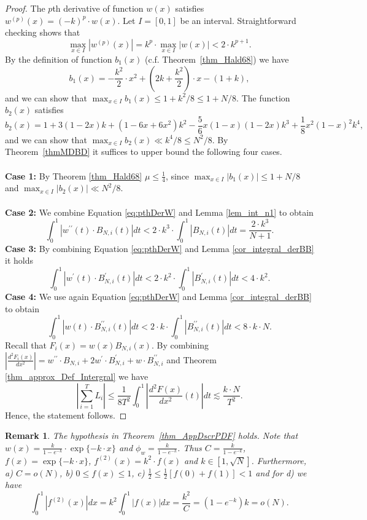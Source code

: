 \documentclass[11pt]{article}
\newcommand{\phiw}{\phi_{w}}
\newcommand{\prm}{\prime}
\renewcommand{\leq}{\leqslant}
\newtheorem{rem}[thm]{Remark}
\numberwithin{thm}{section}
\begin{document}
\begin{proof}
The $p$th derivative of function $w(x)$ satisfies $w^{(p)}(x)=(-k)^{p}\cdot w(x)$. Let $I=[0,1]$ be an interval. Straightforward checking shows that
\begin{equation}\label{eq:pthDerW}
\max_{x\in I}|w^{(p)}(x)| = k^p \cdot \max_{x\in I}|w(x)| < 2\cdot k^{p+1}.
\end{equation}
By the definition of function $b_1(x)$ (c.f. Theorem~\ref{thm_Hald68}) we have
\[
b_{1}(x)=-\frac{k^2}{2}\cdot x^{2} + \left(2k + \frac{k^2}{2} \right)\cdot x -(1+k),
\]
and we can show that $\max_{x\in I}b_{1}(x)\leq 1+k^2/8 \leq 1+N/8$. The function $b_2(x)$ satisfies
\[
b_{2}(x)=1+3(1-2x)k+(1-6x+6x^{2})k^2-\frac{5}{6}x(1-x)(1-2x)k^3 + \frac{1}{8}x^{2}(1-x)^{2}k^{4},
\]
and we can show that $\max_{x\in I}b_{2}(x)\ll k^{4}/8\leq N^2/8$. By Theorem~\ref{thmMDBD} it suffices to upper bound the following four cases.\\
\\
\textbf{Case 1:} By Theorem \ref{thm_Hald68} $\mu\leq\frac{1}{4}$, since $\max_{x\in I}|b_{1}(x)|\leq 1+N/8$
and $\max_{x\in I}|b_{2}(x)|\ll N^{2}/8$.\\
\\
\textbf{Case 2:} We combine Equation \ref{eq:pthDerW}
and Lemma \ref{lem_int_n1} to obtain
\[
\int_{0}^{1}|w^{\prm\prm}(t)\cdot B_{N,i}(t)|dt < 2\cdot k^{3}\cdot\int_{0}^{1}|B_{N,i}(t)|dt=\frac{2\cdot k^{3}}{N+1}.
\]
\textbf{Case 3:} By combining Equation \ref{eq:pthDerW} and Lemma \ref{cor_integral_derBB} it holds
\[
\int_{0}^{1}|w^{\prm}(t)\cdot B_{N,i}^{\prm}(t)|dt < 2\cdot k^{2}\cdot\int_{0}^{1}|B_{N,i}^{\prm}(t)|dt < 4\cdot k^{2}.
\]
\textbf{Case 4:} We use again Equation \ref{eq:pthDerW} and Lemma \ref{cor_integral_derBB} to obtain
\[
\int_{0}^{1}|w(t)\cdot B_{N,i}^{\prm\prm}(t)|dt < 2\cdot k \cdot \int_{0}^{1}|B_{N,i}^{\prm\prm}(t)|dt
< 8\cdot k\cdot N.
\]
Recall that $F_i(x)=w(x)B_{N,i}(x)$. By combining $|\frac{d^{2}F_i(x)}{dx^{2}}|=w^{\prm\prm}\cdot B_{N,i}+2w^{\prm}\cdot B_{N,i}^{\prm}+w\cdot B_{N,i}^{\prm\prm}$ and Theorem \ref{thm_approx_Def_Intergral} we have
\[
\left|\sum_{i=1}^{T}L_{i}\right| \leq \frac{1}{8T^{2}}\int_{0}^{1}\left|\frac{d^{2}F(x)}{dx^{2}}(t)\right|dt \lesssim \frac{k\cdot N}{T^2}.
\]
Hence, the statement follows.
\end{proof}

\begin{rem}
The hypothesis in Theorem~\ref{thm_AppDscrPDF} holds. Note that $w(x)=\frac{k}{1-e^{-k}}\cdot\exp\{ -k\cdot x\}$ and $\phiw=\frac{k}{1-e^{-k}}$. Thus  $C=\frac{k}{1-e^{-k}}$, $f(x)=\exp\{ -k\cdot x\}$, $f^{(2)}(x)=k^2\cdot f(x)$ and $k\in[1,\sqrt{N}]$. Furthermore,\\
a) $C=o(N)$, b) $0\leq f(x)\leq1$, c) $\frac{1}{2}\leq\frac{1}{2}[f(0)+f(1)]<1$ and for d) we have
\[
\int_{0}^{1}|f^{(2)}(x)|dx = k^{2}\int_{0}^{1}|f(x)|dx = \frac{k^{2}}{C}=(1-e^{-k})k = o(N).
\]
\end{rem}
\end{document}

